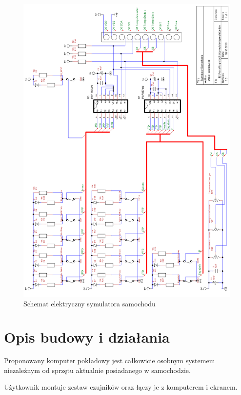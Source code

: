 \documentclass{xmgr}
\begin{document}
\begin{figure}[!hp]
    \centering
    	\includegraphics[height=0.9\textheight]{images/symulator.png}
    \caption{Schemat elektryczny symulatora samochodu}
\end{figure}

\section{Opis budowy i działania}
Proponowany komputer pokładowy jest całkowicie osobnym systemem niezależnym od sprzętu aktualnie posiadanego w samochodzie.

Użytkownik montuje zestaw czujników oraz łączy je z komputerem i ekranem. 
\end{document}
